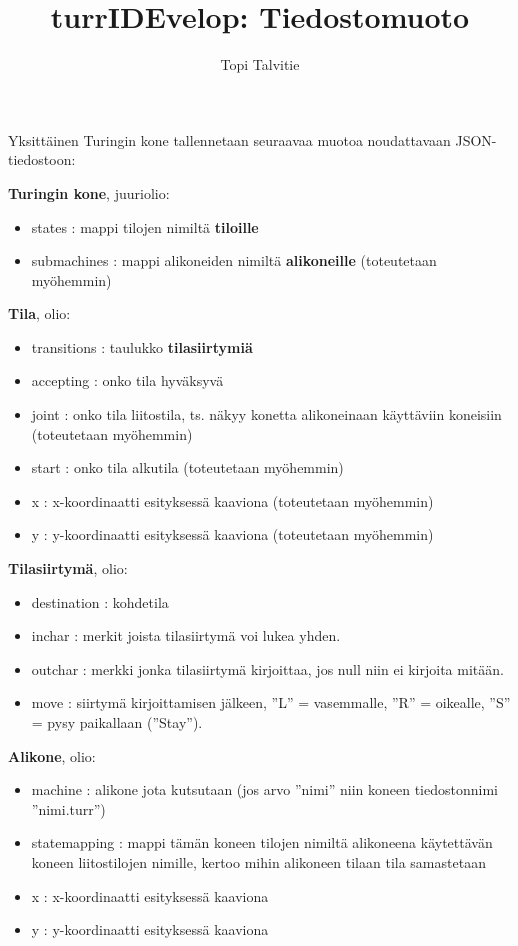 \documentclass[a4paper, 11pt, finnish]{article}
\author{Topi Talvitie}
\title{turrIDEvelop: Tiedostomuoto}
\begin{document}
\maketitle

Yksittäinen Turingin kone tallennetaan seuraavaa muotoa noudattavaan
JSON-tiedostoon:

\textbf{Turingin kone}, juuriolio:
\begin{itemize}
\item states : mappi tilojen nimiltä \textbf{tiloille}
\item submachines : mappi alikoneiden nimiltä \textbf{alikoneille} (toteutetaan
myöhemmin)
\end{itemize}

\textbf{Tila}, olio:
\begin{itemize}
\item transitions : taulukko \textbf{tilasiirtymiä}
\item accepting : onko tila hyväksyvä
\item joint : onko tila liitostila, ts. näkyy konetta alikoneinaan käyttäviin
koneisiin (toteutetaan myöhemmin)
\item start : onko tila alkutila (toteutetaan myöhemmin)
\item x : x-koordinaatti esityksessä kaaviona (toteutetaan myöhemmin)
\item y : y-koordinaatti esityksessä kaaviona (toteutetaan myöhemmin)
\end{itemize}

\textbf{Tilasiirtymä}, olio:
\begin{itemize}
\item destination : kohdetila
\item inchar : merkit joista tilasiirtymä voi lukea yhden.
\item outchar : merkki jonka tilasiirtymä kirjoittaa, jos null niin ei
kirjoita mitään.
\item move : siirtymä kirjoittamisen jälkeen, ''L'' = vasemmalle, ''R'' =
oikealle, ''S'' = pysy paikallaan (''Stay'').
\end{itemize}

\textbf{Alikone}, olio:
\begin{itemize}
\item machine : alikone jota kutsutaan (jos arvo ''nimi'' niin koneen
tiedostonnimi ''nimi.turr'')
\item statemapping : mappi tämän koneen tilojen nimiltä alikoneena käytettävän
koneen liitostilojen nimille, kertoo mihin alikoneen tilaan tila samastetaan
\item x : x-koordinaatti esityksessä kaaviona
\item y : y-koordinaatti esityksessä kaaviona
\end{itemize}
\end{document}
